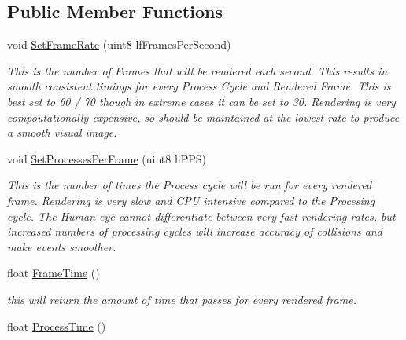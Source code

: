 \subsection*{Public Member Functions}
\begin{DoxyCompactItemize}
\item 
\hypertarget{classc_frame_rate_a11d2578dfcb6eb2fea0bb331b7188dfe}{
void \hyperlink{classc_frame_rate_a11d2578dfcb6eb2fea0bb331b7188dfe}{SetFrameRate} (uint8 lfFramesPerSecond)}
\label{classc_frame_rate_a11d2578dfcb6eb2fea0bb331b7188dfe}

\begin{DoxyCompactList}\small\item\em This is the number of Frames that will be rendered each second. This results in smooth consistent timings for every Process Cycle and Rendered Frame. This is best set to 60 / 70 though in extreme cases it can be set to 30. Rendering is very compoutationally expensive, so should be maintained at the lowest rate to produce a smooth visual image. \end{DoxyCompactList}\item 
\hypertarget{classc_frame_rate_afb2bce05079fe1bc1e7b3ac3295fd692}{
void \hyperlink{classc_frame_rate_afb2bce05079fe1bc1e7b3ac3295fd692}{SetProcessesPerFrame} (uint8 liPPS)}
\label{classc_frame_rate_afb2bce05079fe1bc1e7b3ac3295fd692}

\begin{DoxyCompactList}\small\item\em This is the number of times the Process cycle will be run for every rendered frame. Rendering is very slow and CPU intensive compared to the Procesing cycle. The Human eye cannot differentiate between very fast rendering rates, but increased numbers of processing cycles will increase accuracy of collisions and make events smoother. \end{DoxyCompactList}\item 
\hypertarget{classc_frame_rate_a6af788062fd7f1cff658e19ca790219c}{
float \hyperlink{classc_frame_rate_a6af788062fd7f1cff658e19ca790219c}{FrameTime} ()}
\label{classc_frame_rate_a6af788062fd7f1cff658e19ca790219c}

\begin{DoxyCompactList}\small\item\em this will return the amount of time that passes for every rendered frame. \end{DoxyCompactList}\item 
\hypertarget{classc_frame_rate_ac314f1e240949dc74bd51730748ce1b2}{
float \hyperlink{classc_frame_rate_ac314f1e240949dc74bd51730748ce1b2}{ProcessTime} ()}
\label{classc_frame_rate_ac314f1e240949dc74bd51730748ce1b2}


\end{DoxyCompactItemize}
